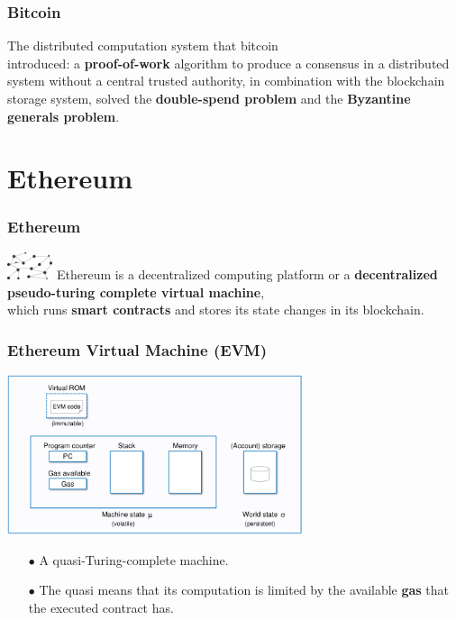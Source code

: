 \documentclass{beamer}
\begin{document}
\begin{frame}
	\frametitle{Bitcoin}
The distributed computation system that bitcoin\\ introduced: a \textbf{proof-of-work} algorithm to produce a consensus in a distributed system without a central trusted authority, in combination with the blockchain storage system, solved the \textbf{double-spend problem} and the \textbf{Byzantine generals problem}.
\linebreak
\linebreak	
\linebreak
\linebreak
\end{frame}

\section{Ethereum}
\begin{frame}
\frametitle{Ethereum}
\includegraphics[width=0.1\textwidth,right]{bc}
Ethereum is a decentralized computing platform or a \textbf{decentralized pseudo-turing complete virtual machine}, \\which runs \textbf{smart contracts} and stores its state changes in its blockchain.
\end{frame}

\begin{frame}
	\frametitle{Ethereum Virtual Machine (EVM)}
	\includegraphics[width=0.65\textwidth, center]{../images/evm}
	\begin{itemize}
		\item[$\bullet$] A quasi-Turing-complete machine.
		\item[$\bullet$] The quasi means that its computation is limited by the available \textbf{gas} that the executed contract has.
	\end{itemize}
\end{frame}
\end{document}
